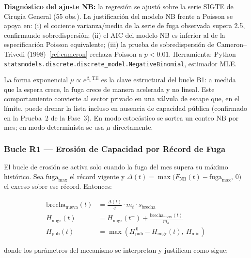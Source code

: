 \documentclass[12pt,a4paper]{article}
\begin{document}
\begin{databox}
  \textbf{Diagnóstico del ajuste NB:} la regresión se ajustó sobre la serie SIGTE de Cirugía General (55 obs.). La justificación del modelo NB frente a Poisson se apoya en: (i) el cociente varianza/media de la serie de fuga observada supera 2.5, confirmando sobredispersión; (ii) el AIC del modelo NB es inferior al de la especificación Poisson equivalente; (iii) la prueba de sobredispersión de Cameron--Trivedi (1998)~\ref{ref:cameron} rechaza Poisson a $p < 0.01$. Herramienta: Python \texttt{statsmodels.discrete.discrete\_model.NegativeBinomial}, estimador MLE.
\end{databox}

La forma exponencial $\mu \propto e^{\beta_1\,\text{TE}}$ es la clave estructural del bucle B1: a medida que la espera crece, la fuga crece de manera acelerada y no lineal. Este comportamiento convierte al sector privado en una válvula de escape que, en el límite, puede drenar la lista incluso en ausencia de capacidad pública (confirmado en la Prueba~2 de la Fase~3). En modo estocástico se sortea un conteo NB por mes; en modo determinista se usa $\mu$ directamente.

\subsubsection*{Bucle R1 — Erosión de Capacidad por Récord de Fuga}

El bucle de erosión se activa solo cuando la fuga del mes supera su máximo histórico. Sea $\text{fuga}_{\max}$ el récord vigente y $\Delta(t) = \max\bigl(F_{\text{NB}}(t) - \text{fuga}_{\max},\,0\bigr)$ el exceso sobre ese récord. Entonces:

\begin{align}
  \text{brecha}_{\text{nueva}}(t)
   & = \frac{\Delta(t)}{q}\cdot m_t \cdot s_{\text{brecha}} \label{eq:brecha}                    \\[4pt]
  H_{\text{migr}}(t)
   & = H_{\text{migr}}(t^-) + \frac{\text{brecha}_{\text{nueva}}(t)}{m_h} \label{eq:hmigr}       \\[4pt]
  H_{\text{pub}}(t)
   & = \max\!\left( H_{\text{pub}}^{\,0} - H_{\text{migr}}(t),\ H_{\min} \right) \label{eq:hpub}
\end{align}

donde los parámetros del mecanismo se interpretan y justifican como sigue:
\end{document}
